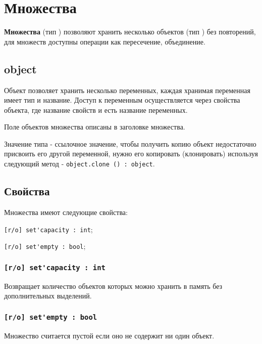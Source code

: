 \section{Множества}

{\bf Множества} (тип \set) позволяют хранить несколько объектов (тип \object) без повторений, для множеств доступны операции как пересечение, объединение.

\subsection{{\color{lightblue} object}}

Объект позволяет хранить несколько переменных, каждая хранимая переменная имеет тип и название. Доступ к переменным осуществляется через свойства объекта, где название свойств и есть название переменных. 

Поле объектов множества описаны в заголовке множества.

Значение типа \object{} - ссылочное значение, чтобы получить копию объект недостаточно присвоить его другой переменной, нужно его копировать (клонировать) используя следующий метод - \lstinline|object.clone () : object|.

\subsection{Свойства}

Множества имеют следующие свойства:
\begin{icItems}
\item \lstinline|[r/o] set'capacity : int|;
\item \lstinline|[r/o] set'empty : bool|;
\end{icItems}

\subsubsection{\lstinline|[r/o] set'capacity : int|}

Возвращает количество объектов которых можно хранить в память без дополнительных выделений.

\subsubsection{\lstinline|[r/o] set'empty : bool|}

Множество считается пустой если оно не содержит ни один объект.

